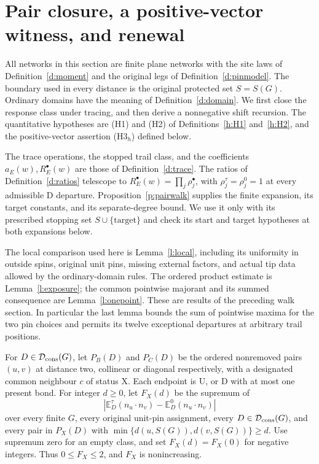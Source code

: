 \section{Pair closure, a positive-vector witness, and renewal}
\label{s:recursion}

All networks in this section are finite plane networks with the site
laws of Definition~\ref{d:moment} and the original legs of
Definition~\ref{d:pinmodel}.  The boundary used in every distance is
the original protected set \(S=S(G)\).  Ordinary domains have the
meaning of Definition~\ref{d:domain}.  We first close the response
class under tracing, and then derive a nonnegative shift recursion.
The quantitative hypotheses are (H1) and (H2) of
Definitions~\ref{h:H1} and~\ref{h:H2}, and the positive-vector
assertion (H3\(_h\)) defined below.

The trace operations, the stopped trail class, and the coefficients
\(a_E(w),R_E^\bullet(w)\) are those of
Definition~\ref{d:trace}.  The ratios of
Definition~\ref{d:ratios} telescope to
\(R_E^\bullet(w)=\prod_j\rho_j^\bullet\), with
\(\rho_j^\tau=\rho_j^0=1\) at every admissible
\(\mathrm D\) departure.  Proposition~\ref{p:pairwalk} supplies
the finite expansion, its target constants, and its separate-degree
bound.  We use it only with its prescribed stopping set
\(S\cup\{\text{target}\}\) and check its start and target
hypotheses at both expansions below.

The local comparison used here is Lemma~\ref{l:local}, including
its uniformity in outside spins, original unit pins, missing
external factors, and actual tip data allowed by the ordinary-domain
rules.  The ordered product estimate is Lemma~\ref{l:exposure};
the common pointwise majorant and its summed consequence are
Lemma~\ref{l:onepoint}.  These are results of the preceding walk
section.  In particular the last lemma bounds the sum of pointwise
maxima for the two pin choices and permits its twelve exceptional
departures at arbitrary trail positions.

\begin{definition}\label{d:pairenv}
For \(D\in\mathcal D_{\rm cons}(G)\), let \(P_B(D)\) and \(P_C(D)\)
be the ordered nonremoved pairs \((u,v)\) at distance two,
collinear or diagonal respectively, with a designated common neighbour
\(c\) of status \(\mathrm X\). Each endpoint is \(\mathrm U\),
or \(\mathrm D\) with at most one present bond.
For integer \(d\ge0\), let \(F_X(d)\) be the supremum of
\[
 \left|\mathbb E_D^\tau(n_u\cdot n_v)
                    -\mathbb E_D^0(n_u\cdot n_v)\right|
\]
over every finite \(G\), every original unit-pin assignment,
every \(D\in\mathcal D_{\rm cons}(G)\), and every pair in \(P_X(D)\)
with \(\min\{d(u,S(G)),d(v,S(G))\}\ge d\).
Use supremum zero for an empty class, and set \(F_X(d)=F_X(0)\)
for negative integers. Thus \(0\le F_X\le2\), and \(F_X\)
is nonincreasing.
\end{definition}

